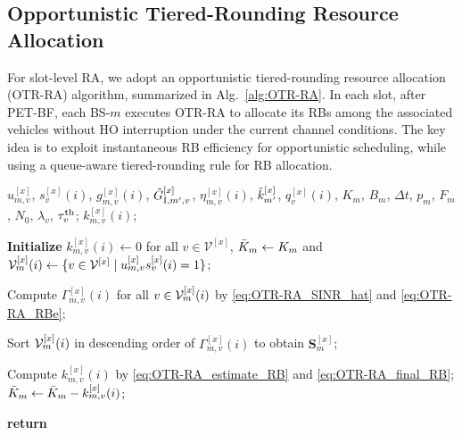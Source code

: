 \documentclass[10pt,journal,letterpaper]{IEEEtran}
\newcommand{\rev}[1]{\textcolor{revisioncolor}{{}#1}}
\newcommand{\omitted}[1]{}
\theoremstyle{remark}
\begin{document}
\subsection{Opportunistic Tiered-Rounding Resource Allocation}
\label{subsection:OTR-RA strategy}

For slot-level RA, we adopt an opportunistic tiered-rounding resource allocation (OTR-RA) algorithm, summarized in Alg.~\ref{alg:OTR-RA}. In each slot, after PET-BF, each BS-$m$ executes OTR-RA to allocate its RBs among the associated vehicles\rev{ without HO interruption} under the current channel conditions. The key idea is to exploit instantaneous RB efficiency for opportunistic scheduling, while using a queue-aware tiered-rounding rule for RB allocation.

\begin{algorithm}[tbp]
    \caption{Opportunistic Tiered-Rounding Resource Allocation (OTR-RA)}
    \label{alg:OTR-RA}
    \renewcommand{\algorithmicrequire}{\textbf{Input:}}
    \renewcommand{\algorithmicensure}{\textbf{Output:}}
    \begin{algorithmic}[1]
        \REQUIRE
        $u_{m,v}^{[x]}$, \rev{$s_v^{[x]}(i)$, }$g_{m,v}^{[x]}(i)$, \omitted{}\rev{$\Tilde{G}_{{\rm I},m',v}^{[x]}$}, $\eta_{m,v}^{[x]}(i)$,
        $\Tilde{k}_{m'}^{[x]}$, $q_v^{[x]}(i)$, $K_m$, $B_m$, $\Delta t$,
        $p_m$, $F_m$, $N_0$, $\lambda_v$, \omitted{}\rev{$\tau_v^{\rm th}$};
        \ENSURE
        $k_{m,v}^{[x]}(i)$;

        \STATE \textbf{Initialize} \rev{$k_{m,v}^{[x]}(i)\gets 0$ for all $v\in\mathcal{V}^{[x]}$, }$\Bar{K}_m \gets K_m$ and
               $\mathcal{V}_m^{[x]}\rev{(i)} \gets \{ v \in \mathcal{V}^{[x]} \mid u_{m,v}^{[x]}\rev{s_v^{[x]}(i)} = 1 \}$;

        \STATE Compute $\Gamma_{m,v}^{[x]}(i)$ for all $v \in \mathcal{V}_m^{[x]}\rev{(i)}$ by \eqref{eq:OTR-RA_SINR_hat} and \eqref{eq:OTR-RA_RBe};

        \STATE Sort $\mathcal{V}_m^{[x]}\rev{(i)}$ in descending order of $\Gamma_{m,v}^{[x]}(i)$
               to obtain $\bm{S}_m^{[x]}$;

            \STATE Compute $k_{m,v}^{[x]}(i)$ by \eqref{eq:OTR-RA_estimate_RB} and \eqref{eq:OTR-RA_final_RB};
            \STATE $\Bar{K}_m \gets \Bar{K}_m - k_{m,v}^{[x]}(i)$;
        \ENDFOR

        \STATE \textbf{return}
    \end{algorithmic}
\end{algorithm}
\end{document}
